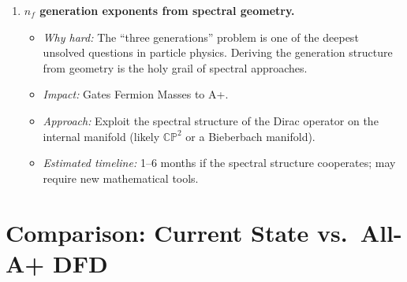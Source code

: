 \documentclass[11pt,a4paper]{article}
\begin{document}
\begin{enumerate}
    \item \textcolor{hardproblem}{\textbf{$n_f$ generation exponents from spectral geometry.}}
    \begin{itemize}
        \item \emph{Why hard:} The ``three generations'' problem is one of the deepest unsolved questions in particle physics. Deriving the generation structure from geometry is the holy grail of spectral approaches.
        \item \emph{Impact:} Gates Fermion Masses to A+.
        \item \emph{Approach:} Exploit the spectral structure of the Dirac operator on the internal manifold (likely $\mathbb{CP}^2$ or a Bieberbach manifold).
        \item \emph{Estimated timeline:} 1--6 months if the spectral structure cooperates; may require new mathematical tools.
    \end{itemize}
\end{enumerate}


\section{Comparison: Current State vs.\ All-A+ DFD}
\end{document}
